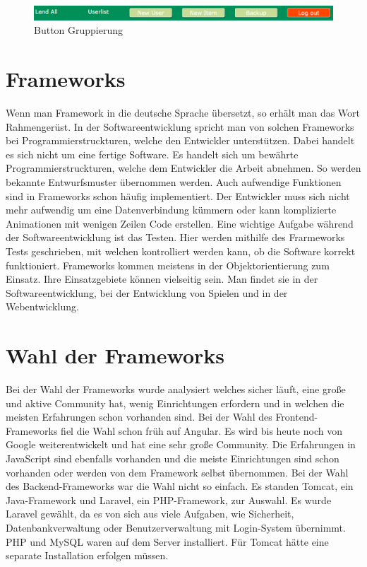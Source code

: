\begin{figure}[bh]
	\centering
	\includegraphics[scale=0.3]{content/pictures/gruppierung.png}
	\caption{Button Gruppierung}
	\label{fig:gruppierung}
\end{figure}


\section{Frameworks}
Wenn man Framework in die deutsche Sprache übersetzt, so erhält man das Wort Rahmengerüst. In der Softwareentwicklung spricht man von solchen Frameworks bei Programmierstruckturen, welche den Entwickler unterstützen. Dabei handelt es sich nicht um eine fertige Software. Es handelt sich um bewährte Programmierstruckturen, welche dem Entwickler die Arbeit abnehmen. So werden bekannte Entwurfsmuster übernommen werden. Auch aufwendige Funktionen sind in Frameworks schon häufig implementiert. Der Entwickler muss sich nicht mehr aufwendig um eine Datenverbindung kümmern oder kann komplizierte Animationen mit wenigen Zeilen Code erstellen. Eine wichtige Aufgabe während der Softwareentwicklung ist das Testen. Hier werden mithilfe des Frarmeworks Tests geschrieben, mit welchen kontrolliert werden kann, ob die Software korrekt funktioniert. Frameworks kommen meistens in der Objektorientierung zum Einsatz. Ihre Einsatzgebiete können vielseitig sein. Man findet sie in der Softwareentwicklung, bei der Entwicklung von Spielen und in der Webentwicklung.

\section{Wahl der Frameworks}
\label{chapter:frameworkchoice}
Bei der Wahl der Frameworks wurde analysiert welches sicher läuft, eine große und aktive Community hat, wenig Einrichtungen erfordern und in welchen die meisten Erfahrungen schon vorhanden sind. Bei der Wahl des Frontend-Frameworks fiel die Wahl schon früh auf Angular. Es wird bis heute noch von Google weiterentwickelt und hat eine sehr große Community. Die Erfahrungen in JavaScript sind ebenfalls vorhanden und die meiste Einrichtungen sind schon vorhanden oder werden von dem Framework selbst übernommen. Bei der Wahl des Backend-Frameworks war die Wahl nicht so einfach. Es standen Tomcat, ein Java-Framework und Laravel, ein \acs{PHP}-Framework, zur Auswahl. Es wurde Laravel gewählt, da es von sich aus viele Aufgaben, wie Sicherheit, Datenbankverwaltung oder Benutzerverwaltung mit Login-System übernimmt. \acs{PHP} und MySQL waren auf dem Server installiert. Für Tomcat hätte eine separate Installation erfolgen müssen.
